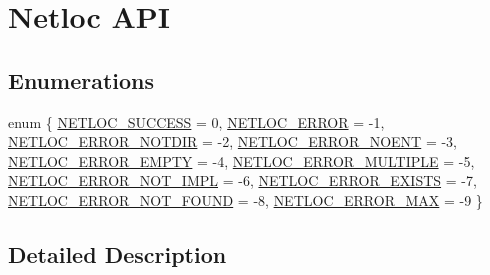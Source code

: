 \hypertarget{a00234}{}\section{Netloc A\+PI}
\label{a00234}
\subsection*{Enumerations}
\begin{DoxyCompactItemize}
\item 
enum \{ \newline
\hyperlink{a00234_gga61dadd085c1777f559549e05962b2c9ea4deb864e4b46fe70b83c3220442a627c}{N\+E\+T\+L\+O\+C\+\_\+\+S\+U\+C\+C\+E\+SS} = 0, 
\hyperlink{a00234_gga61dadd085c1777f559549e05962b2c9ea4b33f8da6efc963562a93569ac8b349a}{N\+E\+T\+L\+O\+C\+\_\+\+E\+R\+R\+OR} = -\/1, 
\hyperlink{a00234_gga61dadd085c1777f559549e05962b2c9ea6e4322619d38dec18dbd16a606b14aa8}{N\+E\+T\+L\+O\+C\+\_\+\+E\+R\+R\+O\+R\+\_\+\+N\+O\+T\+D\+IR} = -\/2, 
\hyperlink{a00234_gga61dadd085c1777f559549e05962b2c9ea81bc77a77d1a42054dc64b11a4cc8612}{N\+E\+T\+L\+O\+C\+\_\+\+E\+R\+R\+O\+R\+\_\+\+N\+O\+E\+NT} = -\/3, 
\newline
\hyperlink{a00234_gga61dadd085c1777f559549e05962b2c9ea0dc7c18a5a3d027bf3f835eacdbed932}{N\+E\+T\+L\+O\+C\+\_\+\+E\+R\+R\+O\+R\+\_\+\+E\+M\+P\+TY} = -\/4, 
\hyperlink{a00234_gga61dadd085c1777f559549e05962b2c9ea4485021555c6cb24d5f6e391b1bd6dee}{N\+E\+T\+L\+O\+C\+\_\+\+E\+R\+R\+O\+R\+\_\+\+M\+U\+L\+T\+I\+P\+LE} = -\/5, 
\hyperlink{a00234_gga61dadd085c1777f559549e05962b2c9ea4a55d10dfc1eb5c84027de7d48dfac4d}{N\+E\+T\+L\+O\+C\+\_\+\+E\+R\+R\+O\+R\+\_\+\+N\+O\+T\+\_\+\+I\+M\+PL} = -\/6, 
\hyperlink{a00234_gga61dadd085c1777f559549e05962b2c9ea67dfc8498fa899900e2231fad4538556}{N\+E\+T\+L\+O\+C\+\_\+\+E\+R\+R\+O\+R\+\_\+\+E\+X\+I\+S\+TS} = -\/7, 
\newline
\hyperlink{a00234_gga61dadd085c1777f559549e05962b2c9ea61b43e2553779d3610f894fd6698a6ee}{N\+E\+T\+L\+O\+C\+\_\+\+E\+R\+R\+O\+R\+\_\+\+N\+O\+T\+\_\+\+F\+O\+U\+ND} = -\/8, 
\hyperlink{a00234_gga61dadd085c1777f559549e05962b2c9ea39974c6110bed527cb7658672b8eeeb9}{N\+E\+T\+L\+O\+C\+\_\+\+E\+R\+R\+O\+R\+\_\+\+M\+AX} = -\/9
 \}
\end{DoxyCompactItemize}


\subsection{Detailed Description}


